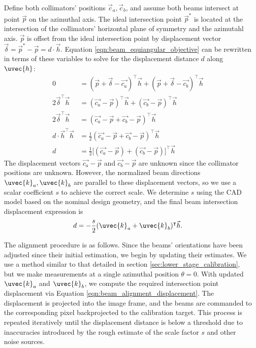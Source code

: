 Define both collimators' positions $\vec{c}_a, \vec{c}_b$, and assume both beams intersect at point $\vec{p}$ on the azimuthal axis. The ideal intersection point $\vec{p}^*$ is located at the intersection of the collimators' horizontal plane of symmetry and the azimutahl axis. $\vec{p}$ is offset from the ideal intersection point by displacement vector $\vec{\delta} = \vec{p}^* - \vec{p} = d \cdot \vec{h}$. Equation \ref{eqn:beam_equiangular_objective} can be rewritten in terms of these variables to solve for the displacement distance $d$ along $\uvec{h}$:
\begin{equation}
    \begin{split}
    0 &= (\vec{p} + \vec{\delta} - \vec{c_a})^\intercal \vec{h} + (\vec{p} + \vec{\delta} - \vec{c_b})^\intercal \vec{h} \\
    2 \vec{\delta}^\intercal \vec{h} &= (\vec{c_a} - \vec{p})^\intercal \vec{h} + (\vec{c_b} - \vec{p})^\intercal \vec{h} \\
    2 \vec{\delta}^\intercal \vec{h} &= (\vec{c_a} - \vec{p} + \vec{c_b} - \vec{p})^\intercal \vec{h} \\
    d \cdot \vec{h}^\intercal \vec{h} &= \tfrac{1}{2} (\vec{c_a} - \vec{p} + \vec{c_b} - \vec{p})^\intercal \vec{h} \\
    d &= \tfrac{1}{2} \big[(\vec{c_a} - \vec{p}) + (\vec{c_b} - \vec{p})\big]^\intercal \vec{h}
    \end{split}
\end{equation}
%
The displacement vectors $\vec{c_a} - \vec{p}$ and $\vec{c_b} - \vec{p}$ are unknown since the collimator positions are unknown. However, the normalized beam directions $\uvec{k}_a, \uvec{k}_b$ are parallel to these displacement vectors, so we use a scalar coefficient $s$ to achieve the correct scale. We determine $s$ using the CAD model based on the nominal design geometry, and the final beam intersection displacement expression is
%
\begin{equation}
    d = -\frac{s}{2} (\uvec{k}_a + \uvec{k}_b)^\intercal \vec{h}.
    \label{eqn:beam_alignment_displacement}
\end{equation}

The alignment procedure is as follows. Since the beams' orientations have been adjusted since their initial estimation, we begin by updating their estimates. We use a method similar to that detailed in section \ref{sec:lower_stage_calibration}, but we make measurements at a single azimuthal position $\theta = 0$. With updated $\uvec{k}_a$ and $\uvec{k}_b$, we compute the required intersection point displacement via Equation \ref{eqn:beam_alignment_displacement}. The displacement is projected into the image frame, and the beams are commanded to the corresponding pixel backprojected to the calibration target. This process is repeated iteratively until the displacement distance is below a threshold due to inaccuracies introduced by the rough estimate of the scale factor $s$ and other noise sources.


